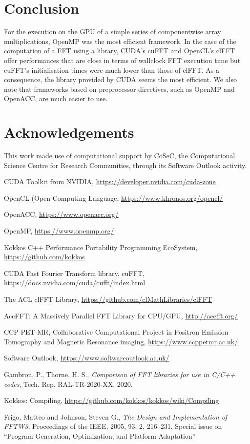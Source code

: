 \documentclass[12pt, a4paper]{article}
\begin{document}
\section{Conclusion}
For the execution on the GPU of a simple series of componentwise array
multiplications, OpenMP was the most efficient framework. In the case
of the computation of a FFT using a library, CUDA's cuFFT and OpenCL's
clFFT offer performances that are close in terms of wallclock FFT
execution time but cuFFT's initialisation times were much lower than
those of clFFT. As a consequence, the library provided by CUDA seems
the most efficient. We also note that frameworks based on preprocessor
directives, such as OpenMP and OpenACC, are much easier to use.

\section*{Acknowledgements}
This work made use of computational support by CoSeC, the
Computational Science Centre for Research Communities, through its
Software Outlook activity.

\begin{thebibliography}{9}

 CUDA Toolkit from NVIDIA, \url{https://developer.nvidia.com/cuda-zone}

 OpenCL (Open Computing Language, \url{https://www.khronos.org/opencl/}

 OpenACC, \url{https://www.openacc.org/}
  
 OpenMP, \url{https://www.openmp.org/}

 Kokkos C++ Performance Portability Programming EcoSystem,
\url{https://github.com/kokkos}

 CUDA Fast Fourier Transform library, cuFFT, \url{https://docs.nvidia.com/cuda/cufft/index.html}

 The ACL clFFT Library, \url{https://github.com/clMathLibraries/clFFT}
  
 AccFFT: A Massively Parallel FFT Library for CPU/GPU, \url{http://accfft.org/}

 CCP PET-MR, Collaborative Computational Project in Positron Emission Tomography and Magnetic Resonance imaging, \url{https://www.ccppetmr.ac.uk/}

 Software Outlook, \url{https://www.softwareoutlook.ac.uk/}

  Gambron, P., Thorne, H. S.,
{\it Comparison of FFT libraries for use in C/C++ codes}, Tech. Rep. RAL-TR-2020-XX, 2020.

 Kokkos: Compiling, \url{https://github.com/kokkos/kokkos/wiki/Compiling}

   Frigo, Matteo and Johnson, Steven G., {\it The Design
    and Implementation of FFTW3}, Proceedings of the IEEE, 2005, 93,
  2, 216--231, Special issue on ``Program Generation, Optimization,
  and Platform Adaptation''

\end{thebibliography}
\end{document}
